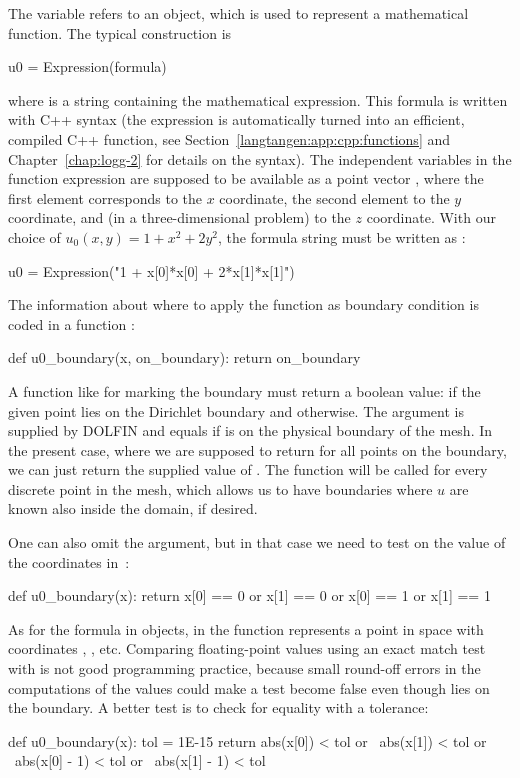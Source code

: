 The  variable refers to an  object, which is
used to represent a mathematical function. The typical construction is
\begin{python}
u0 = Expression(formula)
\end{python}
where  is a string containing the mathematical
expression.  This formula is written with C++ syntax (the expression
is automatically turned into an efficient, compiled C++ function, see
Section~\ref{langtangen:app:cpp:functions} and Chapter~\ref{chap:logg-2}
for details on the syntax). The
independent variables in the function expression are supposed to be
available as a point vector , where the first element 
corresponds to the $x$ coordinate, the second element  to
the $y$ coordinate, and (in a three-dimensional problem) 
to the $z$ coordinate. With our choice of $u_0(x,y)=1 + x^2 + 2y^2$,
the formula string must be written as :
\begin{python}
u0 = Expression("1 + x[0]*x[0] + 2*x[1]*x[1]")
\end{python}

The information about where to apply the  function as boundary
condition is coded in a function : 
\begin{python}
def u0_boundary(x, on_boundary):
    return on_boundary
\end{python}
A function like  for marking the boundary must return
a boolean value:  if the given point  lies on the Dirichlet
boundary and  otherwise.  The argument 
is supplied by DOLFIN and equals
 if  is on the physical boundary of the mesh.
In the present case, where we are supposed to return  for all
points on the boundary, we can just return the supplied value of
.  The
 function will be called for every discrete point in
the mesh, which allows us to have boundaries where $u$ are known also
inside the domain, if desired.

One can also omit the  argument, but in that case we
need to test on the value of the coordinates in~:
\begin{python}
def u0_boundary(x):
    return x[0] == 0 or x[1] == 0 or x[0] == 1 or x[1] == 1
\end{python}
As for the formula in  objects,  in the
 function represents a point in space with coordinates
, , etc. Comparing floating-point values using an
exact match test with \emp{==} is not good programming practice, because
small round-off errors in the computations of the  values could
make a test  become false even though  lies on
the boundary.  A better test is to check for equality with a tolerance:
\begin{python}
def u0_boundary(x):
    tol = 1E-15
    return abs(x[0]) < tol or \
           abs(x[1]) < tol or \
           abs(x[0] - 1) < tol or \
           abs(x[1] - 1) < tol
\end{python}

